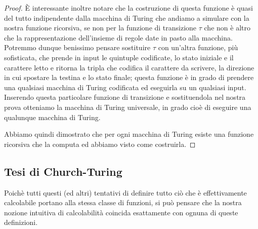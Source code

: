 \begin{proof}
È interessante inoltre notare che la costruzione di questa funzione è
quasi del tutto indipendente dalla macchina di Turing che andiamo a
simulare con la nostra funzione ricorsiva, se non per la funzione di
transizione $\tau$ che non è altro che la rappresentazione
dell'insieme di regole date in pasto alla macchina. Potremmo dunque
benissimo pensare sostituire $\tau$ con un'altra funzione, più
sofisticata, che prende in input le quintuple codificate, lo stato
iniziale e il carattere letto e ritorna la tripla che codifica il
carattere da scrivere, la direzione in cui spostare la testina e lo
stato finale; questa funzione è in grado di prendere una qualsiasi
macchina di Turing codificata ed eseguirla su un qualsiasi
input. Inserendo questa particolare funzione di transizione e
sostituendola nel nostra prova otteniamo la macchina di Turing
universale, in grado cioè di eseguire una qualunque macchina di
Turing.

Abbiamo quindi dimostrato che per ogni macchina di Turing esiste una
funzione ricorsiva che la computa ed abbiamo visto come costruirla.
\end{proof}

\subsection{Tesi di Church-Turing}
Poichè tutti questi (ed altri) tentativi di definire tutto ciò che è
effettivamente calcolabile portano alla stessa classe di funzioni, si
può pensare che la nostra nozione intuitiva di calcolabilità coincida
esattamente con ognuna di queste definizioni.
